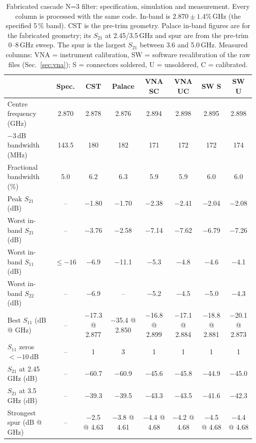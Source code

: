 \documentclass{ieeeaccess}
\begin{document}
\begin{table}[t]
\centering
\footnotesize
\setlength{\tabcolsep}{4pt}
\caption{Fabricated cascade N=3 filter: specification, simulation and measurement. Every column is processed with the same code. In-band is $2.870\pm1.4\%$\,GHz (the specified 5\,\% band). CST is the pre-trim geometry. Palace in-band figures are for the fabricated geometry; its $S_{21}$ at 2.45/3.5\,GHz and spur are from the pre-trim 0--8\,GHz sweep. The spur is the largest $S_{21}$ between 3.6 and 5.0\,GHz. Measured columns: VNA = instrument calibration, SW = software recalibration of the raw files (Sec.~\ref{sec:vna}); S = connectors soldered, U = unsoldered, C = calibrated.}
\label{tab:comparison}
\begin{tabular}{lccccccc}
\hline
 & \textbf{Spec.} & \textbf{CST} & \textbf{Palace} & \textbf{VNA SC} & \textbf{VNA UC} & \textbf{SW S} & \textbf{SW U} \\
\hline
Centre frequency (GHz) & 2.870 & 2.878 & 2.876 & 2.894 & 2.898 & 2.895 & 2.898 \\
$-3$\,dB bandwidth (MHz) & 143.5 & 180 & 182 & 171 & 172 & 172 & 174 \\
Fractional bandwidth (\%) & 5.0 & 6.2 & 6.3 & 5.9 & 5.9 & 6.0 & 6.0 \\
Peak $S_{21}$ (dB) & -- & $-$1.80 & $-$1.70 & $-$2.38 & $-$2.41 & $-$2.04 & $-$2.08 \\
Worst in-band $S_{21}$ (dB) & -- & $-$3.76 & $-$2.58 & $-$7.14 & $-$7.62 & $-$6.79 & $-$7.26 \\
Worst in-band $S_{11}$ (dB) & $\le -16$ & $-$6.9 & $-$11.1 & $-$5.3 & $-$4.8 & $-$4.6 & $-$4.1 \\
Worst in-band $S_{22}$ (dB) & -- & $-$6.9 & -- & $-$5.2 & $-$4.5 & $-$5.0 & $-$4.3 \\
Best $S_{11}$ (dB @ GHz) & -- & $-$17.3 @ 2.877 & $-$35.4 @ 2.850 & $-$16.8 @ 2.899 & $-$17.1 @ 2.884 & $-$18.8 @ 2.881 & $-$20.1 @ 2.873 \\
$S_{11}$ zeros $<-10$\,dB & -- & 1 & 3 & 1 & 1 & 1 & 1 \\
$S_{21}$ at 2.45\,GHz (dB) & -- & $-$60.7 & $-$60.9 & $-$45.6 & $-$45.8 & $-$44.9 & $-$45.0 \\
$S_{21}$ at 3.5\,GHz (dB) & -- & $-$39.3 & $-$39.5 & $-$43.3 & $-$43.5 & $-$41.6 & $-$42.3 \\
Strongest spur (dB @ GHz) & -- & $-$2.5 @ 4.63 & $-$3.8 @ 4.61 & $-$4.4 @ 4.68 & $-$4.2 @ 4.68 & $-$4.5 @ 4.68 & $-$4.4 @ 4.68 \\
\hline
\end{tabular}
\end{table}
\end{document}
